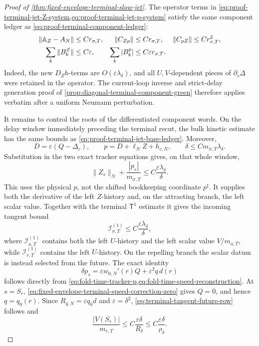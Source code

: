 \begin{proof}[Proof of
\cref{thm:fixed-envelope-terminal-slow-jet}]
The operator terms in
\cref{eq:proof-terminal-jet-Z-system,eq:proof-terminal-jet-p-system}
satisfy the same component ledger as
\cref{eq:proof-terminal-component-ledger}:
\begin{align}
 \|\mathbb A_Z-A_N\|&\le Cr_{\sigma,T},&
 \|C_{Zp}\|&\le Cr_{\sigma,T},&
 \|C_{pZ}\|&\le Cr_{\sigma,T}^2,\notag\\
 \sum_k\|B_k^Z\|&\le C\varepsilon,&
 \sum_k|B_k^p|&\le C\varepsilon r_{\sigma,T}.   \label{eq:proof-terminal-tangent-operator-ledger}
\end{align}
Indeed, the new \(D_Zh\)-terms are
\(O(\varepsilon\lambda_\delta)\), and all \(U,V\)-dependent pieces of
\(\partial_s\Delta\) were retained in the operator.  The current-loop inverse
and strict-delay generation proof of
\cref{prop:diagonal-terminal-component-green} therefore applies verbatim
after a uniform Neumann perturbation.

It remains to control the roots of the differentiated component words.
On the delay window immediately preceding the terminal recut, the bulk
kinetic estimate has the same bounds as
\cref{eq:proof-terminal-jet-base-ledger}.  Moreover,
\[
 D=\varepsilon(Q-\Delta_c),\qquad
 p=D+\ell_NZ+h_{c,N},\qquad
 \delta\le C m_{\sigma,T}\lambda_\delta.
\]
Substitution in the two exact tracker equations gives, on that whole
window,
\[
 \|Z_s\|_N+\frac{|p_s|}{m_{\sigma,T}}
 \le C\frac{\varepsilon\lambda_\delta}{\delta}.
\]
This uses the physical \(p\), not the shifted bookkeeping coordinate
\(p^\sharp\).  It supplies both the derivative of the left \(Z\)-history
and, on the attracting branch, the left scalar value.  Together with the
terminal \(\mathsf T^1\) estimate it gives the incoming tangent bound
\begin{equation}
 \mathcal I_{\sigma,T}^{(1)}
 \le C\frac{\varepsilon\lambda_\delta}{\delta},             \label{eq:proof-terminal-jet-incoming-data}
\end{equation}
where \(\mathcal I_{a,T}^{(1)}\) contains both the left \(U\)-history and
the left scalar value \(V/m_{a,T}\), while
\(\mathcal I_{r,T}^{(1)}\) contains the left \(U\)-history.  On the
repelling branch the scalar datum is instead selected from the future.
The exact identity
\begin{equation}
 \delta p_s=\varepsilon w_{0,N}'(r)Q
                  +\varepsilon^2q\,d(r)          \label{eq:proof-terminal-jet-exact-speed-row}
\end{equation}
follows directly from
\cref{eq:fold-time-tracker-p,eq:fold-time-speed-reconstruction}.
At \(s=S_r\),
\cref{eq:fixed-envelope-terminal-speed-correction-zero} gives \(Q=0\),
and hence \(q=q_0(r)\).  Since
\(R_{q,N}=\varepsilon q_0d\) and \(\varepsilon=\delta^2\),
\cref{eq:terminal-tangent-future-row} follows and
\begin{equation}
 \frac{|V(S_r)|}{m_{r,T}}
 \le C\frac{\varepsilon\delta}{R_\delta}
 \le C\frac{\varepsilon\delta}{\rho_\delta}.    \label{eq:proof-terminal-jet-future-size}
\end{equation}


\end{proof}
